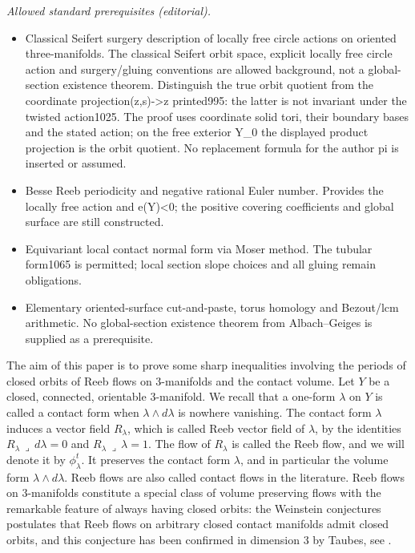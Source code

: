 \documentclass[10pt,a4paper]{amsart}
\numberwithin{equation}{section}
\theoremstyle{definition}
\let\diff d
\begin{document}
\noindent\textit{Allowed standard prerequisites (editorial).}\begin{itemize}
\item Classical Seifert surgery description of locally free circle actions on oriented three-manifolds. The classical Seifert orbit space, explicit locally free circle action and surgery/gluing conventions are allowed background, not a global-section existence theorem. Distinguish the true orbit quotient from the coordinate projection(z,s)->z printed995: the latter is not invariant under the twisted action1025. The proof uses coordinate solid tori, their boundary bases and the stated action; on the free exterior Y\_0 the displayed product projection is the orbit quotient. No replacement formula for the author pi is inserted or assumed.
\item Besse Reeb periodicity and negative rational Euler number. Provides the locally free action and e(Y)<0; the positive covering coefficients and global surface are still constructed.
\item Equivariant local contact normal form via Moser method. The tubular form1065 is permitted; local section slope choices and all gluing remain obligations.
\item Elementary oriented-surface cut-and-paste, torus homology and Bezout/lcm arithmetic. No global-section existence theorem from Albach–Geiges is supplied as a prerequisite.
\end{itemize}\medskip
The aim of this paper is to prove some sharp inequalities involving the periods of closed orbits of Reeb flows on $3$-manifolds and the contact volume.
Let $Y$ be a closed, connected, orientable $3$-manifold. We recall that a one-form $\lambda$ on $Y$ is called a contact form when $\lambda\wedge d\lambda$ is nowhere vanishing. The contact form $\lambda$ induces a vector field $R_{\lambda}$, which is called Reeb vector field of $\lambda$, by the identities $R_{\lambda} \,\lrcorner\, \diff\lambda = 0$ and $R_{\lambda} \,\lrcorner\, \lambda=1$.
The flow of $R_{\lambda}$ is called the Reeb flow, and we will denote it by $\phi_{\lambda}^t$. It preserves the contact form $\lambda$, and in particular the volume form $\lambda\wedge d\lambda$. Reeb flows are also called contact flows in the literature. Reeb flows on $3$-manifolds constitute a special class of volume preserving flows with the remarkable feature of always having closed orbits: the Weinstein conjectures postulates that Reeb flows on arbitrary closed contact manifolds admit closed orbits, and this conjecture has been confirmed in dimension $3$ by Taubes, see \cite{Taubes:2007wi}.
\end{document}
